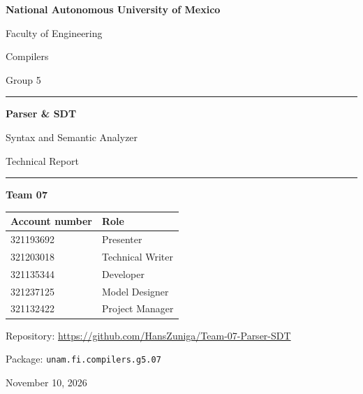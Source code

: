\documentclass[11pt,letterpaper]{article}
\begin{document}
\sloppy

\begin{titlepage}
  \centering
  {\Large\bfseries National Autonomous University of Mexico\par}
  \vspace{0.3cm}
  {\large Faculty of Engineering\par}
  \vspace{2.2cm}
  {\large Compilers\par}
  {\large Group 5\par}
  \vspace{1.8cm}
  {\color{navy}\rule{\linewidth}{1pt}\par}
  \vspace{0.4cm}
  {\Huge\bfseries Parser \& SDT\par}
  \vspace{0.2cm}
  {\Large Syntax and Semantic Analyzer\par}
  \vspace{0.2cm}
  {\large Technical Report\par}
  \vspace{0.4cm}
  {\color{navy}\rule{\linewidth}{1pt}\par}
  \vspace{1.8cm}
  {\large\bfseries Team 07\par}
  \vspace{0.6cm}
  \begin{tabular}{ll}
    \toprule
    \textbf{Account number} & \textbf{Role} \\
    \midrule
    321193692 & Presenter \\        %
    321203018 & Technical Writer \\ %
    321135344 & Developer \\        %
    321237125 & Model Designer \\   %
    321132422 & Project Manager \\  %
    \bottomrule
  \end{tabular}

  \vfill
  {\large Repository: \url{https://github.com/HansZuniga/Team-07-Parser-SDT}\par}
  \vspace{0.3cm}
  {\large Package: \texttt{unam.fi.compilers.g5.07}\par}
  \vspace{1cm}
  {\large November 10, 2026\par}
\end{titlepage}
\end{document}
